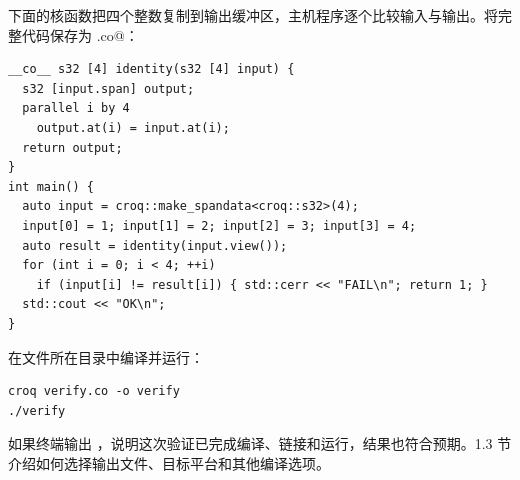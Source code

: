 下面的核函数把四个整数复制到输出缓冲区，主机程序逐个比较输入与输出。将完整代码保存为 \co@verify.co@：

\begin{lstlisting}[language=croqtile,caption={验证安装的最小程序}]
__co__ s32 [4] identity(s32 [4] input) {
  s32 [input.span] output;
  parallel i by 4
    output.at(i) = input.at(i);
  return output;
}
int main() {
  auto input = croq::make_spandata<croq::s32>(4);
  input[0] = 1; input[1] = 2; input[2] = 3; input[3] = 4;
  auto result = identity(input.view());
  for (int i = 0; i < 4; ++i)
    if (input[i] != result[i]) { std::cerr << "FAIL\n"; return 1; }
  std::cout << "OK\n";
}
\end{lstlisting}

在文件所在目录中编译并运行：

\begin{lstlisting}[language=croqtile,caption={编译并运行验证程序}]
croq verify.co -o verify
./verify
\end{lstlisting}

如果终端输出 \co@OK@，说明这次验证已完成编译、链接和运行，结果也符合预期。1.3 节介绍如何选择输出文件、目标平台和其他编译选项。
